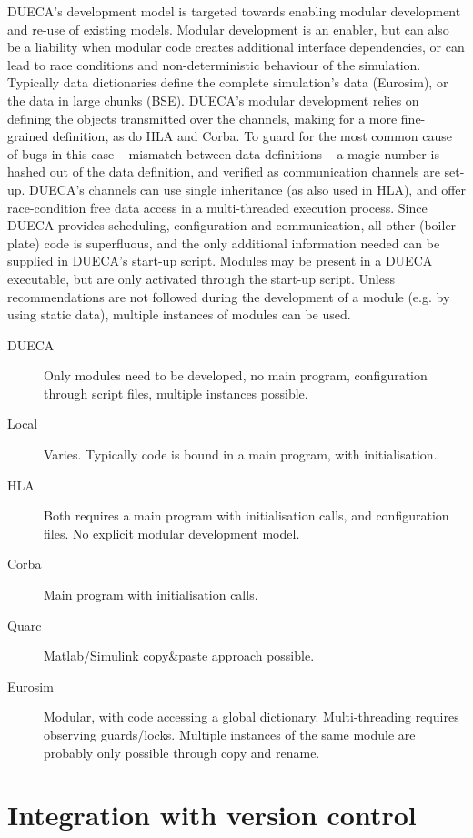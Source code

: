 \documentclass[11pt,a4paper,twoside]{scrreprt}
\begin{document}
DUECA's development model is targeted towards enabling modular development and re-use of existing models. Modular development is an enabler, but can also be a liability when modular code creates additional interface dependencies, or can lead to race conditions and non-deterministic behaviour of the simulation. Typically data dictionaries define the complete simulation's data (Eurosim), or the data in large chunks (BSE). DUECA's modular development relies on defining the objects transmitted over the channels, making for a more fine-grained definition, as do HLA and Corba. To guard for the most common cause of bugs in this case -- mismatch between data definitions -- a magic number is hashed out of the data definition, and verified as communication channels are set-up. DUECA's channels can use single inheritance (as also used in HLA), and offer race-condition free data access in a multi-threaded execution process. Since DUECA provides scheduling, configuration and communication, all other (boiler-plate) code is superfluous, and the only additional information needed can be supplied in DUECA's start-up script. Modules may be present in a DUECA executable, but are only activated through the start-up script. Unless recommendations are not followed during the development of a module (e.g. by using static data), multiple instances of modules can be used.

\begin{description}
\item[DUECA] Only modules need to be developed, no main program, configuration through script files, multiple instances possible.
\item[Local] Varies. Typically code is bound in a main program, with initialisation.
\item[HLA] Both requires a main program with initialisation calls, and configuration files. No explicit modular development model.
\item[Corba] Main program with initialisation calls.
\item[Quarc] Matlab/Simulink copy\&paste approach possible.
\item[Eurosim] Modular, with code accessing a global dictionary. Multi-threading requires observing guards/locks. Multiple instances of the same module are probably only possible through copy and rename.
\end{description}

\section{Integration with version control}
\end{document}
